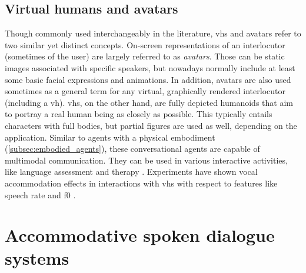 
\subsection{Virtual humans and avatars}
\label{subsec:virtual_humans}

Though commonly used interchangeably in the literature, \acp{vh} and avatars refer to two similar yet distinct concepts.
On-screen representations of an interlocutor (sometimes of the user) are largely referred to as \emph{avatars}.
Those can be static images associated with specific speakers, but nowadays normally include at least some basic facial expressions and animations.
In addition, avatars are also used sometimes as a general term for any virtual, graphically rendered interlocutor (including a \ac{vh}).
\Acp{vh}, on the other hand, are fully depicted humanoids that aim to portray a real human being as closely as possible.
This typically entails characters with full bodies, but partial figures are used as well, depending on the application.
Similar to agents with a physical embodiment (\cref{subsec:embodied_agents}), these conversational agents are capable  of multimodal communication.
They can be used in various interactive activities, like language assessment \citep{Peterson2005learning} and therapy \citep{Devault2014simsensei}.
Experiments have shown vocal accommodation effects in interactions with \acp{vh} with respect to features like speech rate and \ac{f0} \citep{Gijssels2016speech, Staum2010virtually}.

\section{Accommodative spoken dialogue systems}
\label{sec:adaptive_spoken_dialogue_systems}

